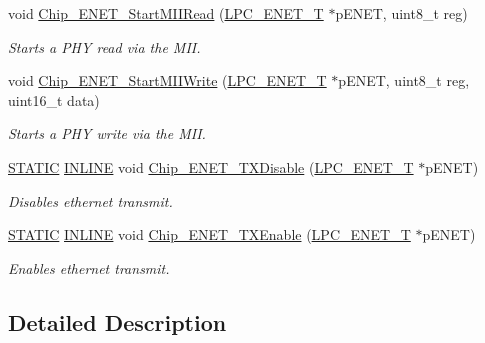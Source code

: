 \begin{DoxyCompactItemize}
void \hyperlink{group__ENET__17XX__40XX_gaca2166605d385fd5150f173cd33a3ac2}{Chip\+\_\+\+E\+N\+E\+T\+\_\+\+Start\+M\+I\+I\+Read} (\hyperlink{structLPC__ENET__T}{L\+P\+C\+\_\+\+E\+N\+E\+T\+\_\+T} $\ast$p\+E\+N\+ET, uint8\+\_\+t reg)
\begin{DoxyCompactList}\small\item\em Starts a P\+HY read via the M\+II. \end{DoxyCompactList}\item 
void \hyperlink{group__ENET__17XX__40XX_gade9f31bbc04119bc06638fd8ce874f73}{Chip\+\_\+\+E\+N\+E\+T\+\_\+\+Start\+M\+I\+I\+Write} (\hyperlink{structLPC__ENET__T}{L\+P\+C\+\_\+\+E\+N\+E\+T\+\_\+T} $\ast$p\+E\+N\+ET, uint8\+\_\+t reg, uint16\+\_\+t data)
\begin{DoxyCompactList}\small\item\em Starts a P\+HY write via the M\+II. \end{DoxyCompactList}\item 
\hyperlink{group__LPC__Types__Public__Macros_ga10b2d890d871e1489bb02b7e70d9bdfb}{S\+T\+A\+T\+IC} \hyperlink{group__LPC__Types__Public__Types_ga2eb6f9e0395b47b8d5e3eeae4fe0c116}{I\+N\+L\+I\+NE} void \hyperlink{group__ENET__17XX__40XX_gaaf0d9ef785afa5a847431e86520430c9}{Chip\+\_\+\+E\+N\+E\+T\+\_\+\+T\+X\+Disable} (\hyperlink{structLPC__ENET__T}{L\+P\+C\+\_\+\+E\+N\+E\+T\+\_\+T} $\ast$p\+E\+N\+ET)
\begin{DoxyCompactList}\small\item\em Disables ethernet transmit. \end{DoxyCompactList}\item 
\hyperlink{group__LPC__Types__Public__Macros_ga10b2d890d871e1489bb02b7e70d9bdfb}{S\+T\+A\+T\+IC} \hyperlink{group__LPC__Types__Public__Types_ga2eb6f9e0395b47b8d5e3eeae4fe0c116}{I\+N\+L\+I\+NE} void \hyperlink{group__ENET__17XX__40XX_gacc7e455d4b168d2405b4ef9dda242488}{Chip\+\_\+\+E\+N\+E\+T\+\_\+\+T\+X\+Enable} (\hyperlink{structLPC__ENET__T}{L\+P\+C\+\_\+\+E\+N\+E\+T\+\_\+T} $\ast$p\+E\+N\+ET)
\begin{DoxyCompactList}\small\item\em Enables ethernet transmit. \end{DoxyCompactList}\end{DoxyCompactItemize}


\subsection{Detailed Description}


